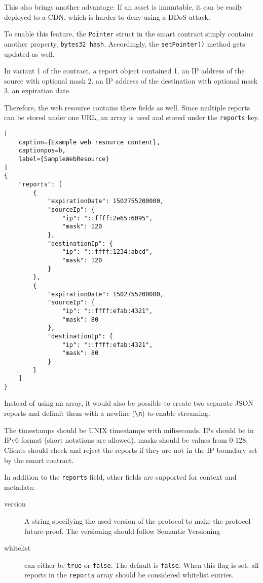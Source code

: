 This also brings another advantage: If an asset is immutable, it can be easily deployed to a CDN, which is harder to deny using a DDoS attack.

To enable this feature, the \texttt{Pointer} struct in the smart contract simply contains another property, \texttt{bytes32 hash}. Accordingly, the \texttt{setPointer()} method gets updated as well.

In variant 1 of the contract, a report object contained 1. an IP address of the source with optional mask 2. an IP address of the destination with optional mask 3. an expiration date.

Therefore, the web resource contains there fields as well. Since multiple reports can be stored under one URL, an array is used and stored under the \texttt{reports} key.

\begin{lstlisting}[
    caption={Example web resource content},
    captionpos=b,
    label={SampleWebResource}
]
{
    "reports": [
        {
            "expirationDate": 1502755200000,
            "sourceIp": {
                "ip": "::ffff:2e65:6095",
                "mask": 120
            },
            "destinationIp": {
                "ip": "::ffff:1234:abcd",
                "mask": 120
            }
        },
        {
            "expirationDate": 1502755200000,
            "sourceIp": {
                "ip": "::ffff:efab:4321",
                "mask": 80
            },
            "destinationIp": {
                "ip": "::ffff:efab:4321",
                "mask": 80
            }
        }
    ]
}
\end{lstlisting}

Instead of using an array, it would also be possible to create two separate JSON reports and delimit them with a newline (\texttt{{\textbackslash}n}) to enable streaming.

The timestamps should be UNIX timestamps with miliseconds. IPs should be in IPv6 format (short notations are allowed), masks should be values from 0-128. Clients should check and reject the reports if they are not in the IP boundary set by the smart contract.

In addition to the \texttt{reports} field, other fields are supported for context and metadata:

\begin{description}

\item [version] A string specifying the used version of the protocol to make the protocol future-proof. The versioning should follow Semantic Versioning \cite{Semver}

\item [whitelist] can either be \texttt{true} or \texttt{false}. The default is \texttt{false}. When this flag is set, all reports in the \texttt{reports} array should be considered whitelist entries.

\end{description}

